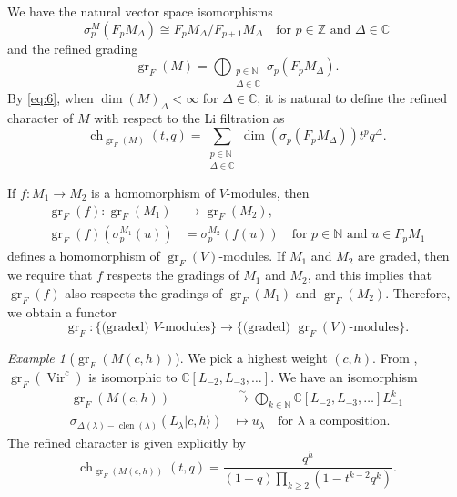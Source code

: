 \documentclass[a4paper, 12pt, reqno]{amsart}
\theoremstyle{remark}
\newtheorem{example}[theorem]{Example}
\DeclareMathOperator{\Vir}{Vir}
\DeclareMathOperator{\ch}{ch}
\DeclareMathOperator{\clen}{clen}
\DeclareMathOperator{\gr}{gr}
\begin{document}
We have the natural vector space isomorphisms
\begin{equation*}
  \sigma^M_p(F_pM_{\Delta}) \cong F_pM_{\Delta}/F_{p + 1}M_{\Delta} \quad \text{for $p \in \mathbb{Z}$ and $\Delta \in \mathbb{C}$}
\end{equation*}
and the refined grading
\begin{equation}
  \label{eq:6}
  \gr_F(M) = \bigoplus_{\substack{p \in \mathbb{N} \\ \Delta \in \mathbb{C}}}\sigma_p(F_pM_{\Delta}).
\end{equation}
By \eqref{eq:6}, when $\dim(M)_{\Delta} < \infty$ for $\Delta \in \mathbb{C}$, it is natural to define the refined character of $M$ with respect to the Li filtration as
\begin{equation*}
  \ch_{\gr_F(M)}(t, q) = \sum_{\substack{p \in \mathbb{N} \\ \Delta \in \mathbb{C}}}\dim(\sigma_p(F_pM_{\Delta}))t^pq^{\Delta}.
\end{equation*}

If $f: M_1 \to M_2$ is a homomorphism of $V$-modules, then
\begin{align*}
  \gr_F(f): \gr_F(M_1) &\to \gr_F(M_2), \\
  \gr_F(f)(\sigma^{M_1}_p(u)) &= \sigma^{M_2}_p(f(u)) \quad \text{for $p \in \mathbb{N}$ and $u \in F_pM_1$}
\end{align*}
defines a homomorphism of $\gr_F(V)$-modules.
If $M_1$ and $M_2$ are graded, then we require that $f$ respects the gradings of $M_1$ and $M_2$, and this implies that $\gr_F(f)$ also respects the gradings of $\gr_F(M_1)$ and $\gr_F(M_2)$.
Therefore, we obtain a functor
\begin{equation*}
  \gr_F: \{\text{(graded) $V$-modules}\} \to \{\text{(graded) $\gr_F(V)$-modules}\}.
\end{equation*}

\begin{example}[$\gr_F(M(c, h))$]
  \label{exa:11}
  We pick a highest weight $(c, h)$.
  From , $\gr_F(\Vir^c)$ is isomorphic to $\mathbb{C}[L_{-2}, L_{-3}, \dots]$.
  We have an isomorphism
  \begin{align*}
    \gr_F(M(c, h)) &\xrightarrow{\sim} \bigoplus_{k \in \mathbb{N}}\mathbb{C}[L_{-2}, L_{-3}, \dots]L_{-1}^k \\
    \sigma_{\Delta(\lambda) - \clen(\lambda)}(L_{\lambda}|c, h\rangle) &\mapsto u_{\lambda} \quad \text{for $\lambda$ a composition}.
  \end{align*}
  The refined character is given explicitly by
  \begin{equation*}
    \ch_{\gr_F(M(c, h))}(t, q) = \frac{q^h}{(1 - q)\prod_{k \ge 2}(1 - t^{k - 2}q^k)}.
  \end{equation*}
\end{example}
\end{document}
